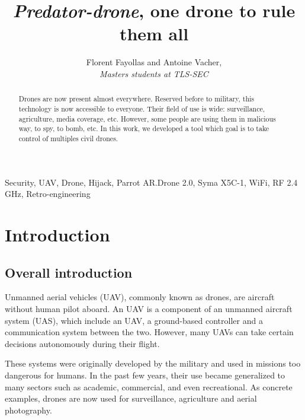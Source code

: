 \documentclass[conference,a4paper]{IEEEtran}
\begin{document}
\title{%
  \textit{Predator-drone}, one drone to rule them all%
}
\author{%
  Florent Fayollas and Antoine Vacher,\\%
  \textit{Masters students at TLS-SEC}%
}
\maketitle


\begin{abstract}
  Drones are now present almost everywhere. Reserved before to military, this technology
  is now accessible to everyone. Their field of use is wide: surveillance, agriculture,
  media coverage, etc. However, some people are using them in malicious way, to spy,
  to bomb, etc. In this work, we developed a tool which goal is to take control of
  multiples civil drones.
\end{abstract}
\vspace*{1.5em}

\begin{IEEEkeywords}
  Security, UAV, Drone, Hijack, Parrot AR.Drone 2.0, Syma X5C-1, WiFi, RF 2.4 GHz, Retro-engineering
\end{IEEEkeywords}
\vspace*{1.5em}



\section{Introduction}
\subsection{Overall introduction}
Unmanned aerial vehicles (UAV), commonly known as drones, are aircraft without human
pilot aboard. An UAV is a component of an unmanned aircraft system (UAS), which include an
UAV, a ground-based controller and a communication system between the two. However, many
UAVs can take certain decisions autonomously during their flight.

These systems were originally developed by the military and used in missions too dangerous for
humans. In the past few years, their use became generalized to many sectors such as
academic, commercial, and even recreational. As concrete examples, drones are now used for
surveillance, agriculture and aerial photography.
\end{document}
